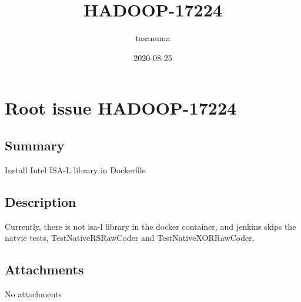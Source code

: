 \documentclass{report}%
\title{HADOOP{-}17224}%
\author{tasanuma}%
\date{2020{-}08{-}25}%
\begin{document}
%
\normalsize%
\maketitle%
\tableofcontents%
\chapter{Root issue HADOOP{-}17224}%
\label{chap:RootissueHADOOP{-}17224}%
\section{Summary}%
\label{sec:Summary}%
Install Intel ISA{-}L library in Dockerfile

%
\section{Description}%
\label{sec:Description}%
Currently, there is not isa{-}l library in the docker container, and jenkins skips the natvie tests, TestNativeRSRawCoder and TestNativeXORRawCoder.

%
\section{Attachments}%
\label{sec:Attachments}%
No attachments

%
\end{document}

